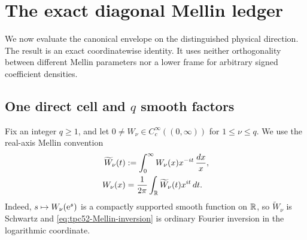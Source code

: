 \section{The exact diagonal Mellin ledger}
\label{sec:tpc52-diagonal-mellin}

We now evaluate the canonical envelope on the distinguished physical
direction.  The result is an exact coordinatewise identity.  It uses
neither orthogonality between different Mellin parameters nor a lower
frame for arbitrary signed coefficient densities.

\subsection{One direct cell and \texorpdfstring{$q$}{q} smooth factors}

Fix an integer \(q\geq1\), and let
\(0\ne W_\nu\in C_c^\infty((0,\infty))\) for
\(1\leq\nu\leq q\).  We use the real-axis Mellin convention
\begin{align}
 \widetilde W_\nu(t)
 &:=\int_0^\infty W_\nu(x)x^{-it}\,\frac{dx}{x},
 \label{eq:tpc52-Mellin-transform}\\
 W_\nu(x)
 &=\frac1{2\pi}\int_\mathbb R
     \widetilde W_\nu(t)x^{it}\,dt.
 \label{eq:tpc52-Mellin-inversion}
\end{align}
Indeed, \(s\mapsto W_\nu(\mathrm e^s)\) is a compactly supported smooth
function on \(\mathbb R\), so \(\widetilde W_\nu\) is Schwartz and
\eqref{eq:tpc52-Mellin-inversion} is ordinary Fourier inversion in
the logarithmic coordinate.

